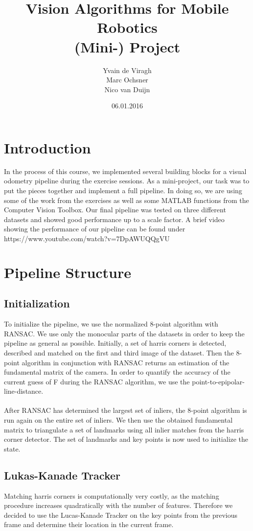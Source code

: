 \documentclass[11pt]{article}
\title{Vision Algorithms for Mobile Robotics\\ (Mini-) Project}
\author{Yvain de Viragh\\Marc Ochsner\\Nico van Duijn}
\date{06.01.2016}
\begin{document}
\maketitle
{}


\section{Introduction}
In the process of this course, we implemented several building blocks for a visual odometry pipeline during the exercise sessions. As a mini-project, our task was to put the pieces together and implement a full pipeline. In doing so, we are using some of the work from the exercises as well as some MATLAB functions from the Computer Vision Toolbox. Our final pipeline was tested on three different datasets and showed good performance up to a scale factor. A brief video showing the performance of our pipeline can be found under https://www.youtube.com/watch?v=7DpAWUQQgVU


\section{Pipeline Structure}
\subsection{Initialization}
To initialize the pipeline, we use the normalized 8-point algorithm with RANSAC. We use only the monocular parts of the datasets in order to keep the pipeline as general as possible. Initially, a set of harris corners is detected, described and matched on the first and third image of the dataset. Then the 8-point algorithm in conjunction with RANSAC returns an estimation of the fundamental matrix of the camera. In order to quantify the accuracy of the current guess of F during the RANSAC algorithm, we use the point-to-epipolar-line-distance.\\
\\
After RANSAC has determined the largest set of inliers, the 8-point algorithm is run again on the entire set of inliers. We then use the obtained fundamental matrix to triangulate a set of landmarks using all inlier matches from the harris corner detector. The set of landmarks and key points is now used to initialize the state.

\subsection{Lukas-Kanade Tracker}
Matching harris corners is computationally very costly, as the matching procedure increases quadratically with the number of features. Therefore we decided to use the Lucas-Kanade Tracker on the key points from the previous frame and determine their location in the current frame. 
\end{document}
